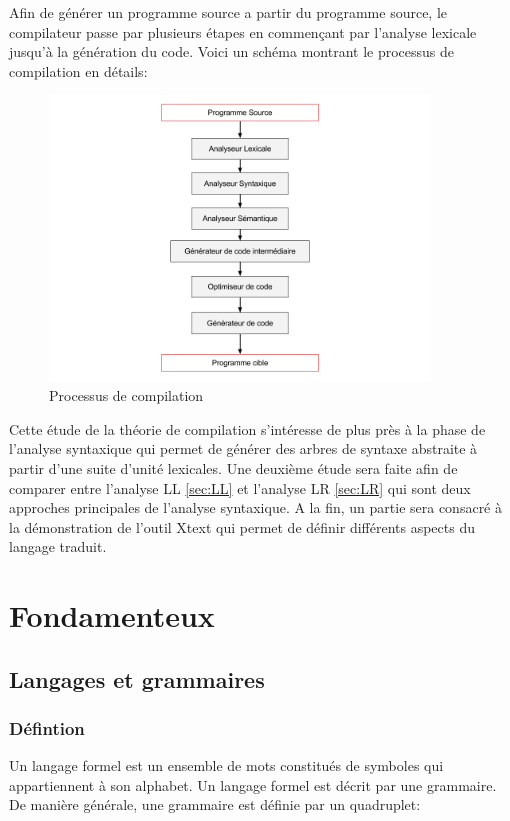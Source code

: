 \documentclass{article}
\begin{document}
Afin de générer un programme source a partir du programme source, le compilateur passe par plusieurs étapes en commençant par l'analyse lexicale jusqu'à la génération du code. Voici un schéma montrant le processus de compilation en détails:

\begin{figure}[h]
	\centering
		\includegraphics[width=0.90\textwidth]{compilation.png}
	\caption{Processus de compilation}
	\label{fig:compilation}
\end{figure}\FloatBarrier

Cette étude de la théorie de compilation s'intéresse de plus près à la phase de l'analyse syntaxique qui permet de générer des arbres de syntaxe abstraite à partir d'une suite d'unité lexicales.
Une deuxième étude sera faite afin de comparer entre l'analyse LL \ref{sec:LL} et l'analyse LR \ref{sec:LR} qui sont deux approches principales de l'analyse syntaxique.
A la fin, un partie sera consacré à la démonstration de l’outil Xtext qui permet de définir différents aspects du langage traduit.  

\section{Fondamenteux}
\label{hints}
\subsection{Langages et grammaires}
\subsubsection{Défintion}
Un langage formel est un ensemble de mots constitués de symboles qui appartiennent à son alphabet.
Un langage formel est décrit par une grammaire.
De manière générale, une grammaire est définie par un quadruplet:
\end{document}

